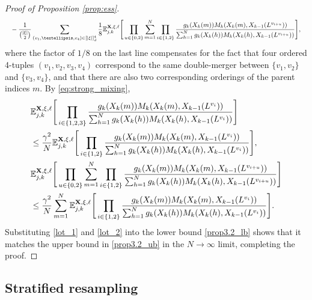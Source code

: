 \documentclass[a4paper,11pt]{article}
\theoremstyle{definition}
\newcommand{\bbE}{\mathbb{E}}
\newcommand{\bfX}{\mathbf{X}}
\begin{document}
\begin{proof}[Proof of Proposition \ref{prop:ess}]
\begin{align}
&\phantom{\geq}- \frac{ 1 }{ \binom{ | \xi | }{ 2 } } \sum_{ ( v_1, \ldots, v_4 ) \in [ | \xi | ]_d^4 } \frac{1}{8}  \bbE_{ j, k }^{ \bfX, \xi, \ell }\Bigg[ \prod_{ u \in \{ 0, 2 \} } \sum_{ m = 1 }^N \prod_{ i \in \{ 1, 2 \} } \frac{ g_k( X_k( m ) ) M_k( X_k( m ), X_{ k - 1 }( L^{ v_{ i + u } } ) ) }{ \sum_{ h = 1 }^N g_k( X_k( h ) ) M_k( X_k( h ), X_{ k - 1 }( L^{ v_{ i + u } } ) ) } \Bigg], \notag
\end{align}
where the factor of $1/8$ on the last line compensates for the fact that four ordered 4-tuples $( v_1, v_2, v_3, v_4 )$ correspond to the same double-merger between $\{ v_1, v_2\}$ and $\{ v_3, v_4 \}$, and that there are also two corresponding orderings of the parent indices $m$.
By \eqref{eq:strong_mixing},
\begin{align}
&\bbE_{ j, k }^{ \bfX, \xi, \ell }\Bigg[\prod_{ i \in \{ 1, 2, 3 \} } \frac{ g_k( X_k( m ) ) M_k( X_k( m ), X_{ k - 1 }( L^{ v_i } ) ) }{ \sum_{ h = 1 }^N g_k( X_k( h ) ) M_k( X_k( h ), X_{ k - 1 }( L^{ v_i } ) ) } \Bigg] \notag \\
&\leq \frac{\gamma^2}{N} \bbE_{ j, k }^{ \bfX, \xi, \ell }\Bigg[\prod_{ i \in \{ 1, 2 \} } \frac{ g_k( X_k( m ) ) M_k( X_k( m ), X_{ k - 1 }( L^{ v_i } ) ) }{ \sum_{ h = 1 }^N g_k( X_k( h ) ) M_k( X_k( h ), X_{ k - 1 }( L^{ v_i } ) ) } \Bigg], \label{lot_1} \\
&\bbE_{ j, k }^{ \bfX, \xi, \ell }\Bigg[ \prod_{ u \in \{ 0, 2 \} } \sum_{ m = 1 }^N \prod_{ i \in \{ 1, 2 \} } \frac{ g_k( X_k( m ) ) M_k( X_k( m ), X_{ k - 1 }( L^{ v_{ i + u } } ) ) }{ \sum_{ h = 1 }^N g_k( X_k( h ) ) M_k( X_k( h ), X_{ k - 1 }( L^{ v_{ i + u } } ) ) } \Bigg] \notag \\
&\leq \frac{\gamma^2}{N} \sum_{ m = 1 }^N \bbE_{ j, k }^{ \bfX, \xi, \ell }\Bigg[ \prod_{ i \in \{ 1, 2 \} } \frac{ g_k( X_k( m ) ) M_k( X_k( m ), X_{ k - 1 }( L^{ v_i } ) ) }{ \sum_{ h = 1 }^N g_k( X_k( h ) ) M_k( X_k( h ), X_{ k - 1 }( L^{ v_i } ) ) } \Bigg]. \label{lot_2}
\end{align}
Substituting \eqref{lot_1} and \eqref{lot_2} into the lower bound \eqref{prop3.2_lb} shows that it matches the upper bound in \eqref{prop3.2_ub} in the $N \to \infty$ limit, completing the proof.
\end{proof}

\subsection{Stratified resampling}\label{app:stratified}
\end{document}
